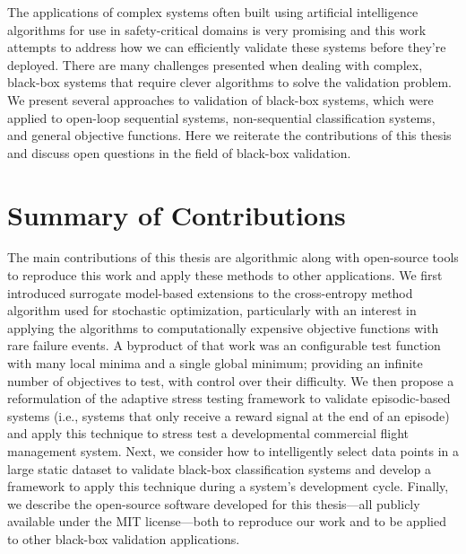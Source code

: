 The applications of complex systems often built using artificial intelligence algorithms for use in safety-critical domains is very promising and this work attempts to address how we can efficiently validate these systems before they're deployed.
There are many challenges presented when dealing with complex, black-box systems that require clever algorithms to solve the validation problem.
We present several approaches to validation of black-box systems, which were applied to open-loop sequential systems, non-sequential classification systems, and general objective functions.
Here we reiterate the contributions of this thesis and discuss open questions in the field of black-box validation.

\section{Summary of Contributions}\label{sec:summary_of_contributions}

The main contributions of this thesis are algorithmic along with open-source tools to reproduce this work and apply these methods to other applications.
We first introduced surrogate model-based extensions to the cross-entropy method algorithm used for stochastic optimization, particularly with an interest in applying the algorithms to computationally expensive objective functions with rare failure events.
A byproduct of that work was an configurable test function with many local minima and a single global minimum; providing an infinite number of objectives to test, with control over their difficulty.
We then propose a reformulation of the adaptive stress testing framework to validate episodic-based systems (i.e., systems that only receive a reward signal at the end of an episode) and apply this technique to stress test a developmental commercial flight management system.
Next, we consider how to intelligently select data points in a large static dataset to validate black-box classification systems and develop a framework to apply this technique during a system's development cycle.
Finally, we describe the open-source software developed for this thesis---all publicly available under the MIT license---both to reproduce our work and to be applied to other black-box validation applications.

